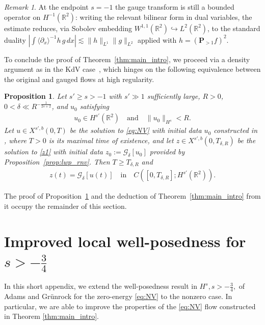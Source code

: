 \documentclass[a4paper,
11pt,  reqno]{amsart}
\newcommand{\jap}[1]{\langle #1 \rangle}
\newcommand{\5}{\textup{V}}
\newcommand{\les}{\lesssim}
\newcommand{\dl}{\delta}
\newcommand{\embeds}{\hookrightarrow}
\newcommand{\dx}{\partial_x}
\newtheorem{proposition}[theorem]{Proposition}
\theoremstyle{remark}
\newtheorem{remark}[theorem]{Remark}
\newcommand{\R}{\mathbb{R}}
\newcommand{\Gc}{\mathcal{G}}
\numberwithin{equation}{section}
\numberwithin{theorem}{section}
\begin{document}
\begin{remark}
At the endpoint $s=-1$ the gauge transform is still a bounded operator on $H^{-1}(\R^2)$: writing the relevant bilinear form in dual variables, the estimate reduces, via Sobolev embedding $W^{1,1}(\R^2)\embeds L^2(\R^2)$, to the standard duality $|\int \jap{\dx}^{-1} h\, g\,dx| \les \|h\|_{L^1}\|g\|_{L^2}$ applied with $h=(\mathbf{P}_{>1} f)^2$.
\end{remark}

To conclude the proof of Theorem~\ref{thm:main_intro}, we proceed via a density argument as in the KdV case~\cite{chcora}, which hinges on the following equivalence between the original and gauged flows at high regularity.

\begin{proposition}\label{PRO:equiv}
Let $s' \ge s > -1$ with $s'\gg1$ sufficiently large, $R>0$, $0<\dl \ll R^{-\frac{1}{2s+2}}$, and $u_0$ satisfying
\begin{align}\label{equiv-0}
u_0\in H^{s'}(\R^2) \quad \text{and} \quad \|u_0\|_{H^s}<R.
\end{align}
Let $u \in X^{s',b}(0,T)$ be the solution to \eqref{eq:NV} with initial data $u_0$ constructed in \cite{angelopolous, kazeykinamunoz1, kazeykinamunoz2}, where $T>0$ is its maximal time of existence, and let $z\in X^{s', b}(0,T_{\delta,R})$ be the solution to \eqref{z1} with initial data $z_0 := \Gc_\delta[u_0]$ provided by Proposition~\ref{prop:lwp_rnv}. Then $T \ge T_{\delta,R}$ and
\begin{align}\label{equiv-1}
z(t)=\Gc_\delta[u(t)] \quad \text{in} \quad C([0,T_{\delta,R}]; H^{s'}(\R^2)).
\end{align}
\end{proposition}

The proof of Proposition~\ref{PRO:equiv} and the deduction of Theorem~\ref{thm:main_intro} from it occupy the remainder of this section.




\appendix

\section{Improved local well-posedness for \texorpdfstring{$s>-\frac34$}{s>-3/4}}\label{sec:s-34}

In this short appendix, we extend the well-posedness result in $H^s, s>-\frac34,$ of Adams and Grünrock for the zero-energy \eqref{eq:NV} to the nonzero case. In particular, we are able to improve the properties of the \eqref{eq:NV} flow constructed in Theorem \ref{thm:main_intro}. 
\end{document}

